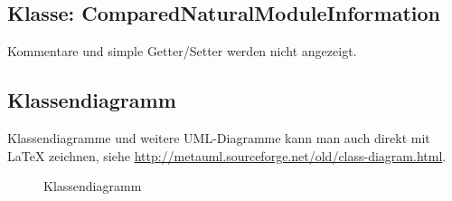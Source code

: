 
\clearpage


\clearpage


\subsection{Klasse: ComparedNaturalModuleInformation}
\label{app:CNMI}
Kommentare und simple Getter/Setter werden nicht angezeigt.

\clearpage

\subsection{Klassendiagramm}
\label{app:Klassendiagramm}
Klassendiagramme und weitere {UML}-Diagramme kann man auch direkt mit \LaTeX{} zeichnen, siehe \zB \url{http://metauml.sourceforge.net/old/class-diagram.html}.
\begin{figure}[htb]
\centering
{}
\caption{Klassendiagramm}
\end{figure}
\clearpage


